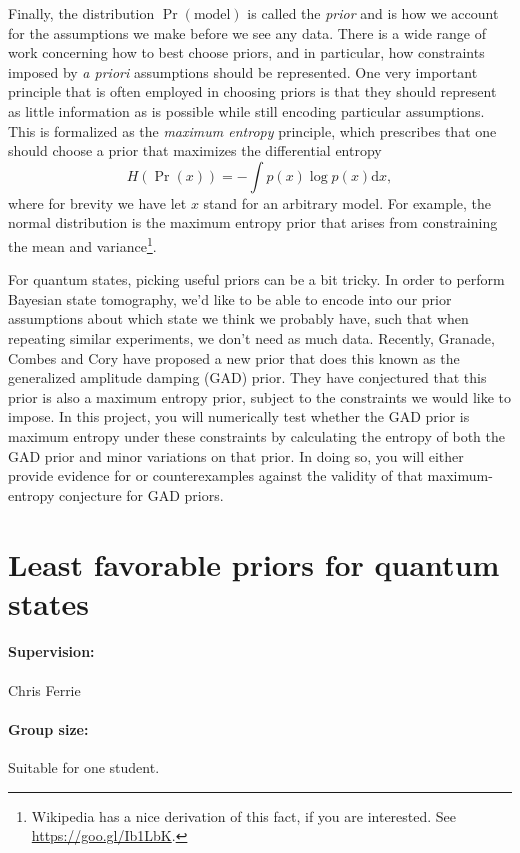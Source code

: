 \documentclass[aps,pra,onecolumn,nofootinbib,superscriptaddress,tightenlines,
notitlepage,12pt]{revtex4-1}
\begin{document}
Finally, the distribution $\Pr(\text{model})$ is called the \emph{prior} and
is how we account for the assumptions we make before we see any data. There is
a wide range of work concerning how to best choose priors, and in particular,
how constraints imposed by \emph{a priori} assumptions should be represented.
One very important principle that is often employed in choosing priors is that
they should represent as little information as is possible while still encoding
particular assumptions. This is formalized as the \emph{maximum entropy} principle,
which prescribes that one should choose a prior that maximizes the
differential entropy
\begin{equation}
    H(\Pr(x)) = -\int p(x) \log p(x) \mathrm{d}x,
\end{equation}
where for brevity we have let $x$ stand for an arbitrary model.
For example, the normal distribution is the maximum entropy prior that arises
from constraining the mean and variance\footnote{Wikipedia has a nice derivation
of this fact, if you are interested. See \url{https://goo.gl/Ib1LbK}.}.

For quantum states, picking useful priors can be a bit tricky. In order to
perform Bayesian state tomography, we'd like to be able to encode into our
prior assumptions about which state we think we probably have, such that when
repeating similar experiments, we don't need as much data. Recently, Granade,
Combes and Cory have proposed a new prior that does this known as the
generalized amplitude damping (GAD) prior. They have conjectured that this
prior is also a maximum entropy prior, subject to the constraints we would
like to impose. In this project, you will numerically test whether the GAD
prior is maximum entropy under these constraints by calculating the entropy of
both the GAD prior and minor variations on that prior. In doing so, you will
either provide evidence for or counterexamples against the validity of that
maximum-entropy conjecture for GAD priors.


\section{Least favorable priors for quantum states}

\paragraph*{Supervision:} Chris Ferrie

\paragraph*{Group size:} Suitable for one student.
\end{document}
